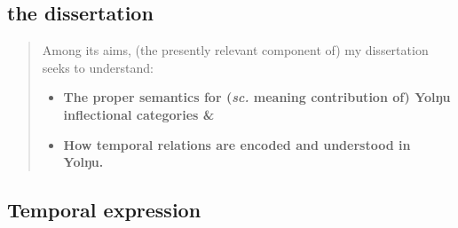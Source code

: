 \documentclass[11pt,dvipsnames]{article}
\begin{document}
\subsection*{the dissertation}

\begin{abstract}
	\noindent	Among its aims, (the presently relevant component of) my dissertation seeks to understand:
	
	\begin{itemize}
		\item \textbf{The proper semantics for (\textit{sc.} meaning contribution of) Yolŋu inflectional categories \&}
		\item \textbf{How temporal relations are encoded and understood in Yolŋu.}
	\end{itemize}
\end{abstract}






\subsection*{Temporal expression}
\end{document}
